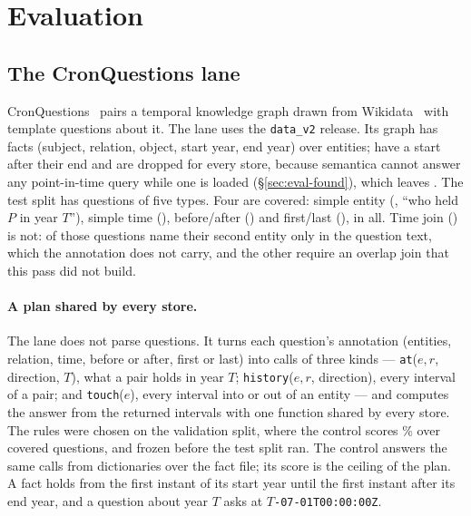 \section{Evaluation}
\label{sec:eval}

\subsection{The CronQuestions lane}
\label{sec:eval-lane}

CronQuestions~\cite{saxena2021cronquestions} pairs a temporal knowledge graph
drawn from Wikidata~\cite{vrandecic2014wikidata} with template questions about
it. The lane uses the \texttt{data\_v2} release. Its graph has
 facts (subject, relation, object, start year, end year) over
 entities;  have a start after their end
and are dropped for every store, because semantica cannot answer any
point-in-time query while one is loaded (\S\ref{sec:eval-found}), which leaves
. The test split has  questions of five types. Four
are covered: simple entity (, ``who held $P$ in year $T$''),
simple time (), before/after () and first/last
(),  in all. Time join () is not:
 of those questions name their second entity only in the
question text, which the annotation does not carry, and the other
 require an overlap join that this pass did not build.

\paragraph{A plan shared by every store.}
The lane does not parse questions. It turns each question's annotation
(entities, relation, time, before or after, first or last) into calls of three
kinds --- \texttt{at}($e, r$, direction, $T$), what a pair holds in year $T$;
\texttt{history}($e, r$, direction), every interval of a pair; and
\texttt{touch}($e$), every interval into or out of an entity --- and computes
the answer from the returned intervals with one function shared by every store.
The rules were chosen on the validation split, where the control scores
\% over  covered questions, and frozen before
the test split ran. The control answers the same calls from dictionaries over
the fact file; its score is the ceiling of the plan. A fact holds from the first
instant of its start year until the first instant after its end year, and a
question about year $T$ asks at \texttt{$T$-07-01T00:00:00Z}.

